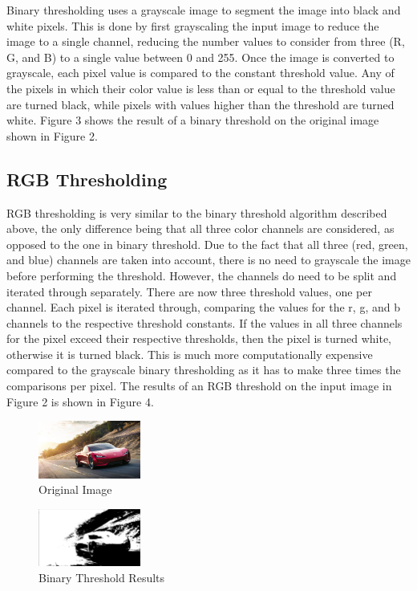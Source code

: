 \documentclass[conference]{IEEEtran}
\begin{document}
Binary thresholding uses a grayscale image to segment the image into black and white pixels.
This is done by first grayscaling the input image to reduce the image to a single channel, reducing the
number values to consider from three (R, G, and B) to a single value between 0 and 255.
Once the image is converted to grayscale, each pixel value is compared to the constant threshold value.
Any of the pixels in which their color value is less than or equal to the threshold value are turned black, while
pixels with values higher than the threshold are turned white. Figure 3 shows the result of a binary threshold on the original image shown in Figure 2. 

\subsection{RGB Thresholding}
RGB thresholding is very similar to the binary threshold algorithm described above, the only difference being that all three color
channels are considered, as opposed to the one in binary threshold. Due to the fact that all three (red, green, and blue) channels are taken into account,
there is no need to grayscale the image before performing the threshold. However, the channels do need to be split and iterated through separately.
There are now three threshold values, one per channel. Each pixel is iterated through, comparing the values for the r, g, and b channels to the respective threshold
constants. If the values in all three channels for the pixel exceed their respective thresholds, then the pixel is turned white, otherwise it is turned black.
This is much more computationally expensive compared to the grayscale binary thresholding as it has to make three times the comparisons per pixel.
The results of an RGB threshold on the input image in Figure 2 is shown in Figure 4.

\newpage

\begin{figure}[h]
\centering
\includegraphics[width=0.3\textwidth]{thresh_in}
\caption{Original Image}
\end{figure}

\begin{figure}[h]
\centering
\includegraphics[width=0.3\textwidth]{thresh_bin}
\caption{Binary Threshold Results}
\end{figure}
\end{document}
